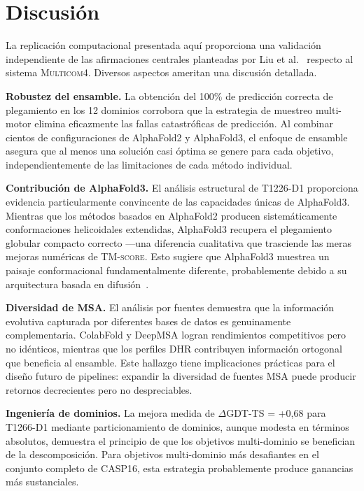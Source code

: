 \documentclass[10pt,twocolumn,a4paper]{article}
\newcommand{\tmscore}{\textsc{TM-score}}
\newcommand{\gdtts}{\textsc{GDT-TS}}
\newcommand{\aff}{AlphaFold2}
\newcommand{\afthree}{AlphaFold3}
\newcommand{\multicom}{\textsc{Multicom4}}
\begin{document}
\section{Discusión}

La replicación computacional presentada aquí proporciona una validación independiente de las afirmaciones centrales planteadas por Liu et al.~\cite{liu2025multicom4} respecto al sistema \multicom{}. Diversos aspectos ameritan una discusión detallada.

\textbf{Robustez del ensamble.} La obtención del 100\% de predicción correcta de plegamiento en los 12 dominios corrobora que la estrategia de muestreo multi-motor elimina eficazmente las fallas catastróficas de predicción. Al combinar cientos de configuraciones de \aff{} y \afthree{}, el enfoque de ensamble asegura que al menos una solución casi óptima se genere para cada objetivo, independientemente de las limitaciones de cada método individual.

\textbf{Contribución de AlphaFold3.} El análisis estructural de T1226-D1 proporciona evidencia particularmente convincente de las capacidades únicas de \afthree{}. Mientras que los métodos basados en \aff{} producen sistemáticamente conformaciones helicoidales extendidas, \afthree{} recupera el plegamiento globular compacto correcto ---una diferencia cualitativa que trasciende las meras mejoras numéricas de \tmscore{}. Esto sugiere que \afthree{} muestrea un paisaje conformacional fundamentalmente diferente, probablemente debido a su arquitectura basada en difusión~\cite{abramson2024alphafold3}.

\textbf{Diversidad de MSA.} El análisis por fuentes demuestra que la información evolutiva capturada por diferentes bases de datos es genuinamente complementaria. ColabFold y DeepMSA logran rendimientos competitivos pero no idénticos, mientras que los perfiles DHR contribuyen información ortogonal que beneficia al ensamble. Este hallazgo tiene implicaciones prácticas para el diseño futuro de pipelines: expandir la diversidad de fuentes MSA puede producir retornos decrecientes pero no despreciables.

\textbf{Ingeniería de dominios.} La mejora medida de $\Delta$\gdtts{} = +0,68 para T1266-D1 mediante particionamiento de dominios, aunque modesta en términos absolutos, demuestra el principio de que los objetivos multi-dominio se benefician de la descomposición. Para objetivos multi-dominio más desafiantes en el conjunto completo de CASP16, esta estrategia probablemente produce ganancias más sustanciales.
\end{document}
